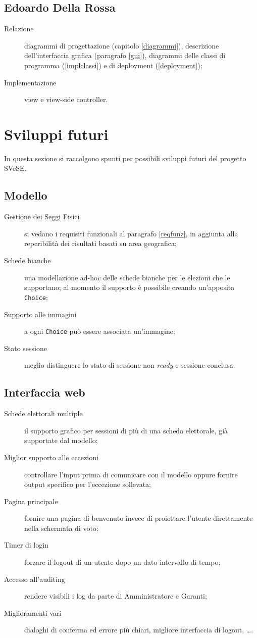 \subsection{Edoardo Della Rossa}
\begin{description}
	\item[Relazione] diagrammi di progettazione (capitolo \ref{diagrammi}), descrizione dell'interfaccia grafica (paragrafo \ref{gui}), diagrammi delle classi di programma (\ref{implclassi}) e di deployment (\ref{deployment});
	\item[Implementazione] view e view-side controller.
\end{description}




\section{Sviluppi futuri}
In questa sezione si raccolgono spunti per possibili sviluppi futuri del progetto SVeSE.


\subsection{Modello}
\begin{description}
	\item[Gestione dei Seggi Fisici] si vedano i requisiti funzionali al paragrafo \ref{reqfunz}, in aggiunta alla reperibilità dei risultati basati su area geografica;
	\item[Schede bianche] una modellazione ad-hoc delle schede bianche per le elezioni che le supportano; al momento il supporto è possibile creando un'apposita \verb!Choice!;
	\item[Supporto alle immagini] a ogni \verb!Choice! può essere associata un'immagine;
	\item[Stato sessione] meglio distinguere lo stato di sessione non \emph{ready} e sessione conclusa.
\end{description}


\subsection{Interfaccia web}
\begin{description}
	\item[Schede elettorali multiple] il supporto grafico per sessioni di più di una scheda elettorale, già supportate dal modello;
	\item[Miglior supporto alle eccezioni] controllare l'input prima di comunicare con il modello oppure fornire output specifico per l'eccezione sollevata;
	\item[Pagina principale] fornire una pagina di benvenuto invece di proiettare l'utente direttamente nella schermata di voto;
	\item[Timer di login] forzare il logout di un utente dopo un dato intervallo di tempo;
	\item[Accesso all'auditing] rendere visibili i log da parte di Amministratore e Garanti;
	\item[Miglioramenti vari] dialoghi di conferma ed errore più chiari, migliore interfaccia di logout, \dots.
\end{description}


